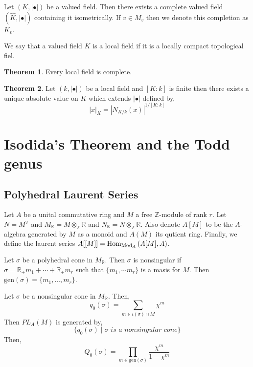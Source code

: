 \documentclass[12pt]{extarticle}
\newcommand{\Z}{\mathbb{Z}}
\newcommand{\R}{\mathbb{R}}
\theoremstyle{definition}
\newtheorem{theorem}{Theorem}[section]
\newenvironment{definition}[1][Definition:]{\begin{trivlist}
\item[\hskip \labelsep {\bfseries #1}]}{\end{trivlist}}
\newcommand{\gen}[1]{\langle #1 \rangle}
\begin{document}
\begin{definition}
Let $(K, | \bullet |)$ be a valued field. Then there exists a complete valued field $(\hat{K}, | \bullet |)$ containing it isometrically. If $v \in M_v$ then we denote this completion as $K_v$. 
\end{definition}

\begin{definition}
We say that a valued field $K$ is a local field if it is a locally compact topological fiel.
\end{definition}

\begin{theorem}
Every local field is complete.
\end{theorem}

\begin{theorem}
Let $(k, |\bullet|)$ be a local field and $[ K : k ]$ is finite then there exists a unique absolute value on $K$ which extends $| \bullet |$ defined by,
\[ | x |_K = | N_{K/k}(x)|^{1/[K : k]} \]
\end{theorem}

\section{Isodida's Theorem and the Todd genus}

\subsection{Polyhedral Laurent Series}


\begin{definition}
Let $A$ be a unital commutative ring and $M$ a free $\Z$-module of rank $r$. Let $N = M^\vee$ and $M_{\R} = M \otimes_\Z \R$ and $N_\R = N \otimes_\Z \R$. Also denote $A[M]$ to be the $A$-algebra generated by $M$ as a monoid and $A(M)$ its qutient ring. Finally, we define the laurent series $A[[M]] = \mathrm{Hom}_{\mathrm{Mod}_A}\left( A[M], A \right)$. 
\end{definition}

\renewcommand{\gen}[1]{\mathrm{gen}\left( #1 \right)}

\begin{definition}
Let $\sigma$ be a polyhedral cone in $M_\R$. Then $\sigma$ is nonsingular if $\sigma = \R_{+} m_1 + \cdots + \R_{+} m_r$ such that $\{ m_1, \dotsm m_r \}$ is a masis for $M$. Then $\gen{\sigma} = \{ m_1, \dots, m_r \}$.
\end{definition}

\begin{definition}
Let $\sigma$ be a nonsingular cone in $M_\R$. Then,
\[ q_0(\sigma) = \sum_{m \in \iota(\sigma) \cap M} \chi^m \]
Then $PL_A(M)$ is generated by,
\[ \{ q_0(\sigma) \mid \sigma \textit{ is a nonsingular cone} \} \]
Then,
\[ Q_0(\sigma) = \prod_{m \in \gen{\sigma}} \frac{\chi^m}{1 - \chi^m} \]
\end{definition}
\end{document}
